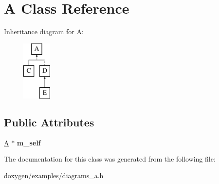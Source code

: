 \hypertarget{class_a}{}\section{A Class Reference}
\label{class_a}
Inheritance diagram for A\+:\begin{figure}[H]
\begin{center}
\leavevmode
\includegraphics[height=3.000000cm]{class_a}
\end{center}
\end{figure}
\subsection*{Public Attributes}
\begin{DoxyCompactItemize}
\item 
\mbox{\label{class_a_a086d3a4efc697dba0601b9fef3d082ad}} 
\mbox{\hyperlink{class_a}{A}} $\ast$ {\bfseries m\+\_\+self}
\end{DoxyCompactItemize}


The documentation for this class was generated from the following file\+:\begin{DoxyCompactItemize}
\item 
doxygen/examples/diagrams\+\_\+a.\+h\end{DoxyCompactItemize}
